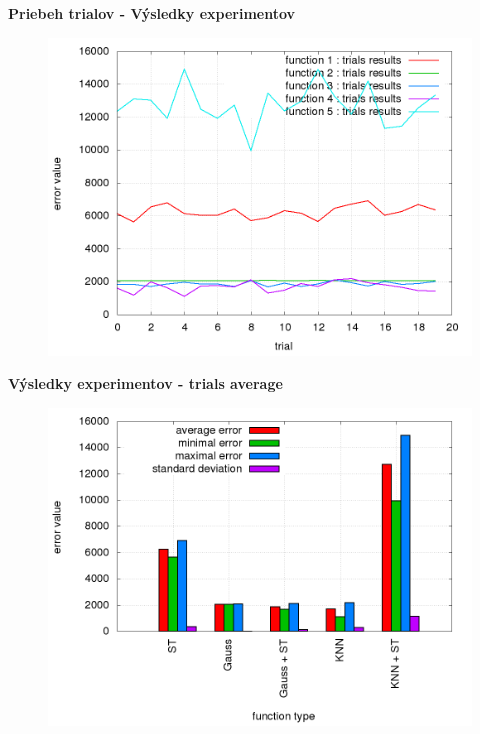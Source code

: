 \documentclass[xcolor=dvipsnames]{beamer}
\begin{document}
\begin{frame}{\bf Priebeh trialov - Výsledky experimentov}

\begin{figure}[!htb]
\centering
\includegraphics[scale=.36]{../../results_q_learning/map_1/trials_average_results_progress.png}
\end{figure}

\end{frame}



\begin{frame}{\bf Výsledky experimentov - trials average}

\begin{figure}[!htb]
\centering
\includegraphics[scale=.36]{../../results_q_learning/map_1/trials_average_results.png}
\end{figure}

\end{frame}
\end{document}
